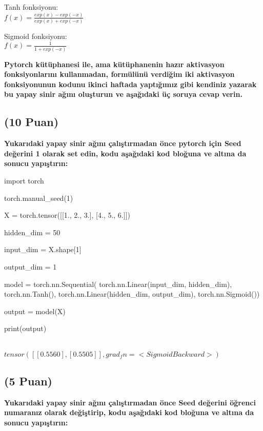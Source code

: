\documentclass[11pt]{article}
\begin{document}
Tanh fonksiyonu:\\
$f(x) = \frac{exp(x) - exp(-x)}{exp(x) + exp(-x)}$
\vspace{.2in}

Sigmoid fonksiyonu:\\
$f(x) = \frac{1}{1 + exp(-x)}$

\vspace{.2in}
 \textbf{Pytorch kütüphanesi ile, ama kütüphanenin hazır aktivasyon fonksiyonlarını kullanmadan, formülünü verdiğim iki aktivasyon fonksiyonunun kodunu ikinci haftada yaptığımız gibi kendiniz yazarak bu yapay sinir ağını oluşturun ve aşağıdaki üç soruya cevap verin.}
 
\subsection{(10 Puan)} \textbf{Yukarıdaki yapay sinir ağını çalıştırmadan önce pytorch için Seed değerini 1 olarak set edin, kodu aşağıdaki kod bloğuna ve altına da sonucu yapıştırın:}

\begin{python}
import torch

torch.manual_seed(1)

X = torch.tensor([[1., 2., 3.], [4., 5., 6.]])

hidden_dim = 50

input_dim = X.shape[1]

output_dim = 1

model = torch.nn.Sequential(
          torch.nn.Linear(input_dim, hidden_dim),
          torch.nn.Tanh(),
          torch.nn.Linear(hidden_dim, output_dim),
          torch.nn.Sigmoid())

output = model(X)

print(output)

\end{python}

\textbf\\${tensor([[0.5560],
        [0.5505]], grad_fn=<SigmoidBackward>)}$


\subsection{(5 Puan)} \textbf{Yukarıdaki yapay sinir ağını çalıştırmadan önce Seed değerini öğrenci numaranız olarak değiştirip, kodu aşağıdaki kod bloğuna ve altına da sonucu yapıştırın:}
\end{document}

